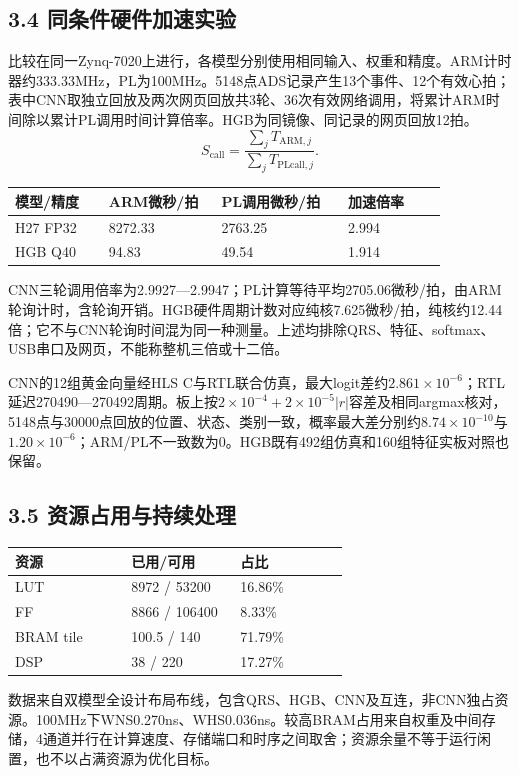 \documentclass[UTF8,12pt,a4paper]{ctexart}
\begin{document}
\subsection{3.4 同条件硬件加速实验}
比较在同一Zynq-7020上进行，各模型分别使用相同输入、权重和精度。ARM计时器约333.33MHz，PL为100MHz。5148点ADS记录产生13个事件、12个有效心拍；表中CNN取独立回放及两次网页回放共3轮、36次有效网络调用，将累计ARM时间除以累计PL调用时间计算倍率。HGB为同镜像、同记录的网页回放12拍。
\[
S_{\mathrm{call}}=\frac{\sum_jT_{\mathrm{ARM},j}}{\sum_jT_{\mathrm{PLcall},j}}.
\]
\begin{longtable}{L{0.20\linewidth}L{0.24\linewidth}L{0.27\linewidth}L{0.21\linewidth}}
\toprule 模型/精度 & ARM微秒/拍 & PL调用微秒/拍 & 加速倍率 \\ \midrule
H27 FP32 & 8272.33 & 2763.25 & 2.994 \\
HGB Q40 & 94.83 & 49.54 & 1.914 \\
\bottomrule
\end{longtable}
CNN三轮调用倍率为2.9927—2.9947；PL计算等待平均2705.06微秒/拍，由ARM轮询计时，含轮询开销。HGB硬件周期计数对应纯核7.625微秒/拍，纯核约12.44倍；它不与CNN轮询时间混为同一种测量。上述均排除QRS、特征、softmax、USB串口及网页，不能称整机三倍或十二倍。

CNN的12组黄金向量经HLS C与RTL联合仿真，最大logit差约$2.861\times10^{-6}$；RTL延迟270490—270492周期。板上按$2\times10^{-4}+2\times10^{-5}|r|$容差及相同argmax核对，5148点与30000点回放的位置、状态、类别一致，概率最大差分别约$8.74\times10^{-10}$与$1.20\times10^{-6}$；ARM/PL不一致数为0。HGB既有492组仿真和160组特征实板对照也保留。

\subsection{3.5 资源占用与持续处理}
\begin{longtable}{L{0.32\linewidth}L{0.30\linewidth}L{0.30\linewidth}}
\toprule 资源 & 已用/可用 & 占比 \\ \midrule
LUT & 8972 / 53200 & 16.86\% \\
FF & 8866 / 106400 & 8.33\% \\
BRAM tile & 100.5 / 140 & 71.79\% \\
DSP & 38 / 220 & 17.27\% \\
\bottomrule
\end{longtable}
数据来自双模型全设计布局布线，包含QRS、HGB、CNN及互连，非CNN独占资源。100MHz下WNS0.270ns、WHS0.036ns。较高BRAM占用来自权重及中间存储，4通道并行在计算速度、存储端口和时序之间取舍；资源余量不等于运行闲置，也不以占满资源为优化目标。
\end{document}
